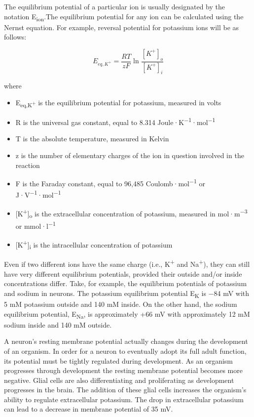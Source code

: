 \documentclass[]{book}
\providecommand{\tightlist}{%
  \setlength{\itemsep}{0pt}\setlength{\parskip}{0pt}}
\begin{document}
The equilibrium potential of a particular ion is usually designated by the notation E\textsubscript{ion}.The equilibrium potential for any ion can be calculated using the Nernst equation. For example, reversal potential for potassium ions will be as follows:

\[  E_{eq,K^+} = \frac{RT}{zF} \ln \frac{[K^+]_{o}}{[K^+]_{i}} \]

where

\begin{itemize}
\tightlist
\item
  E\textsubscript{eq,K\textsuperscript{+}} is the equilibrium potential for potassium, measured in volts
\item
  R is the universal gas constant, equal to 8.314 Joule·K\textsuperscript{−1}·mol\textsuperscript{−1}
\item
  T is the absolute temperature, measured in Kelvin
\item
  z is the number of elementary charges of the ion in question involved in the reaction
\item
  F is the Faraday constant, equal to 96,485 Coulomb·mol\textsuperscript{−1} or J·V\textsuperscript{−1}·mol\textsuperscript{−1}
\item
  {[}K\textsuperscript{+}{]}\textsubscript{o} is the extracellular concentration of potassium, measured in mol·m\textsuperscript{−3} or mmol·l\textsuperscript{−1}
\item
  {[}K\textsuperscript{+}{]}\textsubscript{i} is the intracellular concentration of potassium
\end{itemize}

Even if two different ions have the same charge (i.e., K\textsuperscript{+} and Na\textsuperscript{+}), they can still have very different equilibrium potentials, provided their outside and/or inside concentrations differ. Take, for example, the equilibrium potentials of potassium and sodium in neurons. The potassium equilibrium potential E\textsubscript{K} is −84 mV with 5 mM potassium outside and 140 mM inside. On the other hand, the sodium equilibrium potential, E\textsubscript{Na}, is approximately +66 mV with approximately 12 mM sodium inside and 140 mM outside.

A neuron's resting membrane potential actually changes during the development of an organism. In order for a neuron to eventually adopt its full adult function, its potential must be tightly regulated during development. As an organism progresses through development the resting membrane potential becomes more negative. Glial cells are also differentiating and proliferating as development progresses in the brain. The addition of these glial cells increases the organism's ability to regulate extracellular potassium. The drop in extracellular potassium can lead to a decrease in membrane potential of 35 mV.
\end{document}
